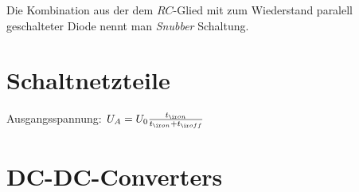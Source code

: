 \documentclass[fs, footer]{latex4ei}
\begin{document}
\begin{multicols*}{4}
{	Die Kombination aus der dem $RC$-Glied mit zum Wiederstand paralell geschalteter Diode nennt man \emph{Snubber} Schaltung. 
} 

\section{Schaltnetzteile}

Ausgangsspannung: $U_A = U_0 \frac{t_{\ir on}}{t_{\ir on} + t_{\ir off}}$

\section{DC-DC-Converters}
\end{multicols*}
\end{document}
